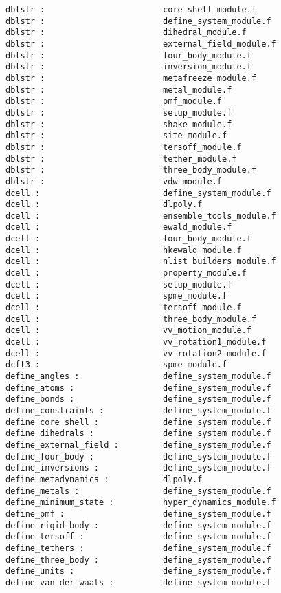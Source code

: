 \begin{verbatim}
dblstr :                        core_shell_module.f 
dblstr :                        define_system_module.f 
dblstr :                        dihedral_module.f 
dblstr :                        external_field_module.f 
dblstr :                        four_body_module.f 
dblstr :                        inversion_module.f 
dblstr :                        metafreeze_module.f 
dblstr :                        metal_module.f 
dblstr :                        pmf_module.f 
dblstr :                        setup_module.f 
dblstr :                        shake_module.f 
dblstr :                        site_module.f 
dblstr :                        tersoff_module.f 
dblstr :                        tether_module.f 
dblstr :                        three_body_module.f 
dblstr :                        vdw_module.f 
dcell :                         define_system_module.f
dcell :                         dlpoly.f
dcell :                         ensemble_tools_module.f
dcell :                         ewald_module.f
dcell :                         four_body_module.f
dcell :                         hkewald_module.f
dcell :                         nlist_builders_module.f
dcell :                         property_module.f
dcell :                         setup_module.f
dcell :                         spme_module.f
dcell :                         tersoff_module.f
dcell :                         three_body_module.f
dcell :                         vv_motion_module.f
dcell :                         vv_rotation1_module.f
dcell :                         vv_rotation2_module.f
dcft3 :                         spme_module.f
define_angles :                 define_system_module.f
define_atoms :                  define_system_module.f
define_bonds :                  define_system_module.f
define_constraints :            define_system_module.f
define_core_shell :             define_system_module.f
define_dihedrals :              define_system_module.f
define_external_field :         define_system_module.f
define_four_body :              define_system_module.f
define_inversions :             define_system_module.f
define_metadynamics :           dlpoly.f
define_metals :                 define_system_module.f
define_minimum_state :          hyper_dynamics_module.f
define_pmf :                    define_system_module.f
define_rigid_body :             define_system_module.f
define_tersoff :                define_system_module.f
define_tethers :                define_system_module.f
define_three_body :             define_system_module.f
define_units :                  define_system_module.f
define_van_der_waals :          define_system_module.f

\end{verbatim}
